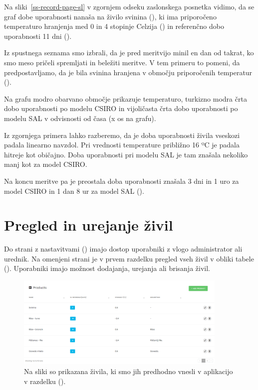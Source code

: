 \documentclass[a4paper, 12pt]{book}
\begin{document}
Na sliki~\ref{ss-record-page-sl} v zgornjem odseku zaslonskega posnetka vidimo, da se graf dobe uporabnosti nanaša na živilo svinina (), ki ima priporočeno temperaturo hranjenja med 0 in 4 stopinje Celzija () in referenčno dobo uporabnosti 11 dni ().

Iz spustnega seznama smo izbrali, da je pred meritvijo minil en dan od takrat, ko smo meso pričeli spremljati in beležiti meritve. V tem primeru to pomeni, da predpostavljamo, da je bila svinina hranjena v območju priporočenih temperatur ().

Na grafu modro obarvano območje prikazuje temperaturo, turkizno modra črta dobo uporabnosti po modelu CSIRO in vijoličasta črta dobo uporabnosti po modelu SAL v odvisnosti od časa (x os na grafu).

Iz zgornjega primera lahko razberemo, da je doba uporabnosti živila vseskozi padala linearno navzdol. Pri vrednosti temperature približno 16 ºC je padala hitreje kot običajno. Doba uporabnosti pri modelu SAL je tam znašala nekoliko manj kot za model CSIRO.

Na koncu meritve pa je preostala doba uporabnosti znašala 3 dni in 1 uro za model CSIRO in 1 dan 8 ur za model SAL ().



\section{Pregled in urejanje živil}

Do strani z nastavitvami () imajo dostop uporabniki z vlogo administrator ali urednik. Na omenjeni strani je v prvem razdelku pregled vseh živil v obliki tabele (). Uporabniki imajo možnost dodajanja, urejanja ali brisanja živil.

\begin{figure}[h]
\begin{center}
\includegraphics[width=0.9\textwidth]{slike/products.png}
\end{center}
\caption{Na sliki so prikazana živila, ki smo jih predhodno vnesli v aplikacijo v razdelku ().}
\label{ss-settings-products}
\end{figure}
\end{document}
